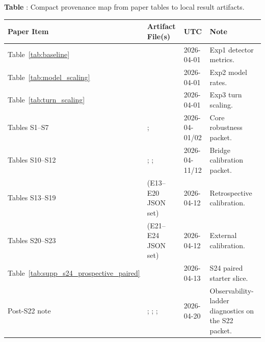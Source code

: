 \begin{center}
\textbf{Table \thetable}: Compact provenance map from paper tables to local result artifacts.
\label{tab:artifact_map}
\end{center}
\begingroup
\centering
\scriptsize
\setlength{\tabcolsep}{2pt}
\begin{tabularx}{\textwidth}{@{}L{1.9cm}L{6.0cm}L{1.9cm}Y@{}}
\toprule
\textbf{Paper Item} & \textbf{Artifact File(s)} & \textbf{UTC} & \textbf{Note} \\
\midrule
Table~\ref{tab:baseline} &  & 2026-04-01 & Exp1 detector metrics. \\
Table~\ref{tab:model_scaling} &  & 2026-04-01 & Exp2 model rates. \\
Table~\ref{tab:turn_scaling} &  & 2026-04-01 & Exp3 turn scaling. \\
Tables S1--S7 & ;  & 2026-04-01/02 & Core robustness packet. \\
Tables S10--S12 & ; ;  & 2026-04-11/12 & Bridge calibration packet. \\
Tables S13--S19 &  (E13--E20 JSON set) & 2026-04-12 & Retrospective calibration. \\
Tables S20--S23 &  (E21--E24 JSON set) & 2026-04-12 & External calibration. \\
Table~\ref{tab:supp_s24_prospective_paired} &  & 2026-04-13 & S24 paired starter slice. \\
Post-S22 note & ; ; ;  & 2026-04-20 & Observability-ladder diagnostics on the S22 packet. \\
\bottomrule
\end{tabularx}
\par
\endgroup


